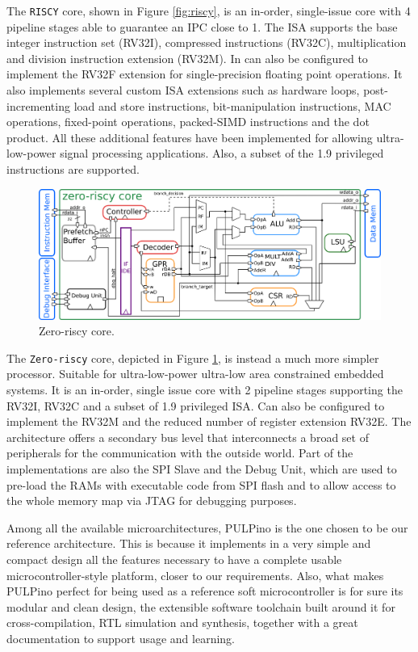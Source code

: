 The \texttt{RISCY} core, shown in Figure \ref{fig:riscy}, is an in-order, single-issue core with 4 pipeline stages able to guarantee an IPC close to 1. The ISA supports the base integer instruction set (RV32I), compressed instructions (RV32C), multiplication and division instruction extension (RV32M). In can also be configured to implement the RV32F extension for single-precision floating point operations. It also implements several custom ISA extensions such as hardware loops, post-incrementing load and store instructions, bit-manipulation instructions, MAC operations, fixed-point operations, packed-SIMD instructions and the dot product. All these additional features have been implemented for allowing ultra-low-power signal processing applications. Also, a subset of the 1.9 privileged instructions are supported.

\begin{figure}[h!]
\centering
\vspace{0.5cm}
\includegraphics[scale=0.7]{./images/zeroriscy}
\caption{Zero-riscy core.}
\label{fig:zeroriscy} %
\end{figure}

The \texttt{Zero-riscy} core, depicted in Figure \ref{fig:zeroriscy}, is instead a much more simpler processor. Suitable for ultra-low-power ultra-low area constrained embedded systems. It is an in-order, single issue core with 2 pipeline stages supporting the RV32I, RV32C and a subset of 1.9 privileged ISA. Can also be configured to implement the RV32M and the reduced number of register extension RV32E. The architecture offers a secondary bus level that interconnects a broad set of peripherals for the communication with the outside world. Part of the implementations are also the SPI Slave and the Debug Unit, which are used to pre-load the RAMs with executable code from SPI flash and to allow access to the whole memory map via JTAG for debugging purposes.

Among all the available microarchitectures, PULPino is the one chosen to be our reference architecture. This is because it implements in a very simple and compact design all the features necessary to have a complete usable microcontroller-style platform, closer to our requirements. Also, what makes PULPino perfect for being used as a reference soft microcontroller is for sure its modular and clean design, the extensible software toolchain built around it for cross-compilation, RTL simulation and synthesis, together with a great documentation to support usage and learning.


